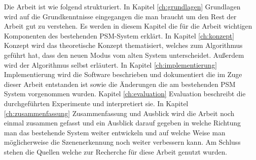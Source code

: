Die Arbeit ist wie folgend strukturiert. In Kapitel \ref{ch:grundlagen} Grundlagen wird auf die Grundkenntnisse eingegangen die man braucht um den Rest der Arbeit gut zu verstehen. Es werden in diesem Kapitel die für die Arbeit wichtigen Komponenten des bestehenden PSM-System erklärt. In Kapitel \ref{ch:konzept} Konzept wird das theoretische Konzept thematisiert, welches zum Algorithmus geführt hat, dass den neuen Modus vom alten System unterscheidet. Außerdem wird der Algorithmus selbst erläutert. In Kapitel \ref{ch:implementierung} Implementierung wird die Software beschrieben und dokumentiert die im Zuge dieser Arbeit entstanden ist sowie die Änderungen die am bestehenden PSM System vorgenommen wurden. Kapitel \ref{ch:evaluation} Evaluation beschreibt die durchgeführten Experimente und interpretiert sie. In Kapitel \ref{ch:zusammenfassung} Zusammenfassung und Ausblick wird die Arbeit noch einmal zusammen gefasst und ein Ausblick darauf gegeben in welche Richtung man das bestehende System weiter entwickeln und auf welche Weise man  möglicherweise die Szenenerkennung noch weiter verbessern kann. Am Schluss stehen die Quellen welche zur Recherche für diese Arbeit genutzt wurden.


